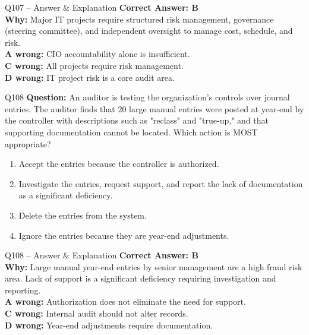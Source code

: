 \documentclass[aspectratio=169,10pt]{beamer}
\begin{document}
	\begin{frame}[t]{Q107 -- Answer \& Explanation}
		\small
		\textbf{Correct Answer: B} \\[4pt]
		\textbf{Why:} Major IT projects require structured risk management, governance (steering committee), and independent oversight to manage cost, schedule, and risk. \\[4pt]
		\textbf{A wrong:} CIO accountability alone is insufficient. \\[2pt]
		\textbf{C wrong:} All projects require risk management. \\[2pt]
		\textbf{D wrong:} IT project risk is a core audit area.
	\end{frame}
	
	\begin{frame}[t]{Q108}
		\small
		\textbf{Question:} An auditor is testing the organization's controls over journal entries. The auditor finds that 20 large manual entries were posted at year-end by the controller with descriptions such as "reclass" and "true-up," and that supporting documentation cannot be located. Which action is MOST appropriate?
		\begin{enumerate}[label=\Alph*.,itemsep=1pt,topsep=2pt]
			\item Accept the entries because the controller is authorized.
			\item Investigate the entries, request support, and report the lack of documentation as a significant deficiency.
			\item Delete the entries from the system.
			\item Ignore the entries because they are year-end adjustments.
		\end{enumerate}
	\end{frame}
	
	\begin{frame}[t]{Q108 -- Answer \& Explanation}
		\small
		\textbf{Correct Answer: B} \\[4pt]
		\textbf{Why:} Large manual year-end entries by senior management are a high fraud risk area. Lack of support is a significant deficiency requiring investigation and reporting. \\[4pt]
		\textbf{A wrong:} Authorization does not eliminate the need for support. \\[2pt]
		\textbf{C wrong:} Internal audit should not alter records. \\[2pt]
		\textbf{D wrong:} Year-end adjustments require documentation.
	\end{frame}
	
\end{document}
